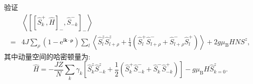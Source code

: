 \begin{question2}{}{}
        验证
\begin{align}
&\left\langle\left[\left[\hat{S}_{k}^{+}, \hat{H}\right]_{-}, \hat{S}_{-k}^{-}\right]_{-}\right\rangle\nonumber \\
= & 4 J \sum_{\rho}\left(1-\mathrm{e}^{\mathrm{i} \boldsymbol{k} \cdot \boldsymbol{\rho}}\right) \sum_{l}\left\langle\hat{S}_{l}^{z} \hat{S}_{l+\rho}^{z}+\frac{1}{4}\left(\hat{S}_{l}^{+} \hat{S}_{l+\rho}^{-}+\hat{S}_{l+\rho}^{-} \hat{S}_{l}^{+}\right)\right\rangle+2 g \mu_{\mathrm{B}} H N S^{z} ,
\end{align}
其中动量空间的哈密顿量为:
\begin{equation}
\hat{H}=-\frac{J Z}{N} \sum_{k} \gamma_{k}\left[\hat{S}_{k}^{z} \hat{S}_{-k}^{z}+\frac{1}{2}\left(\hat{S}_{k}^{+} \hat{S}_{-k}^{-}+\hat{S}_{k}^{-} \hat{S}_{-k}^{+}\right)\right]-g \mu_{\mathrm{B}} H \hat{S}_{k=0}^{z}.
\end{equation}
\end{question2}
